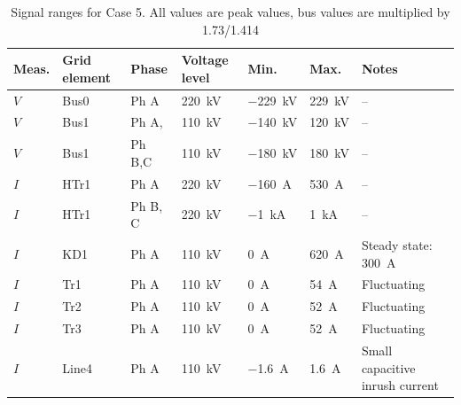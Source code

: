 
\begin{table}[htbp]
  \centering
  \caption{Signal ranges for Case 5. All values are peak values, bus values are multiplied by 1.73/1.414}
  \label{tab:measurement-values-case5}
  \small
  \setlength{\tabcolsep}{3.5pt}
  \renewcommand{\arraystretch}{1.18}
  \begin{tabularx}{\textwidth}{@{}
      >{\raggedright\arraybackslash}p{}
      >{\raggedright\arraybackslash}p{}
      >{\raggedright\arraybackslash}p{}
      >{\raggedright\arraybackslash}p{}
      >{\raggedright\arraybackslash}p{}
      >{\raggedright\arraybackslash}p{}
      Y@{}}
    \toprule
    \textbf{Meas.} &
    \textbf{Grid element} &
    \textbf{Phase} &
    \textbf{Voltage level} &
    \textbf{Min.} &
    \textbf{Max.} &
    \textbf{Notes} \\
    \midrule
    $V$ & Bus0  & Ph A       & \SI{220}{\kilo\volt} & \SI{-229}{\kilo\volt} & \SI{229}{\kilo\volt} & -- \\
    $V$ & Bus1  & Ph A,    & \SI{110}{\kilo\volt} & \SI{-140}{\kilo\volt} & \SI{120}{\kilo\volt} & -- \\
    $V$ & Bus1  & Ph B,C     & \SI{110}{\kilo\volt} & \SI{-180}{\kilo\volt} & \SI{180}{\kilo\volt} & -- \\
    $I$ & HTr1  & Ph A       & \SI{220}{\kilo\volt} & \SI{-160}{\ampere} & \SI{530}{\ampere} & -- \\
    $I$ & HTr1  & Ph B, C    & \SI{220}{\kilo\volt} & \SI{-1}{\kilo\ampere} & \SI{1}{\kilo\ampere} & -- \\
    $I$ & KD1   & Ph A       & \SI{110}{\kilo\volt} & \SI{0}{\ampere} & \SI{620}{\ampere} & Steady state: \SI{300}{\ampere} \\
    $I$ & Tr1   & Ph A       & \SI{110}{\kilo\volt} & \SI{0}{\ampere} & \SI{54}{\ampere} &  Fluctuating \\
    $I$ & Tr2   & Ph A       & \SI{110}{\kilo\volt} & \SI{0}{\ampere} & \SI{52}{\ampere} &  Fluctuating \\
    $I$ & Tr3   & Ph A      & \SI{110}{\kilo\volt} & \SI{0}{\ampere} & \SI{52}{\ampere} &  Fluctuating \\
    $I$ & Line4 & Ph A & \SI{110}{\kilo\volt} & \SI{-1.6}{\ampere} & \SI{1.6}{\ampere} & Small capacitive inrush current  \\

\end{tabularx}
\end{table}
